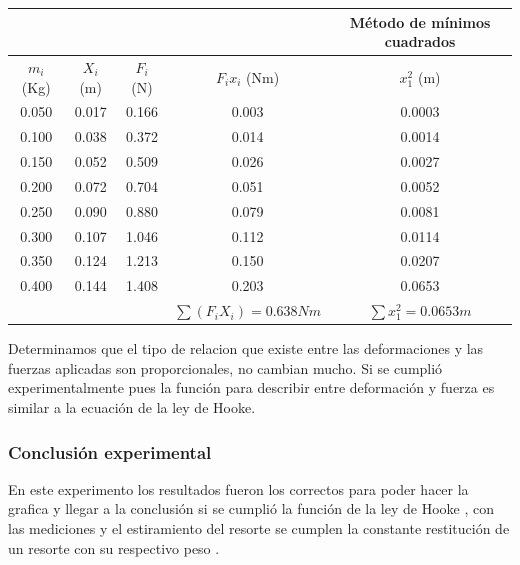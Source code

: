 \documentclass[10pt]{article}
\begin{document}
\begin{multicols}{2}
\begin{center}
	\begin{adjustbox}{width=245pt}
		\begin{tabular}{|c|c|c|c|c|}
			\hline
			 &  &  &  & Método de mínimos cuadrados   \\
			\hline
			$m_{i}$ (Kg)&  $X_{i}$ (m)& $F_{i}$ (N)& $F_{i} x_{i}$ (Nm)& $x_1^2$ (m) \\
			\hline
			0.050& 0.017 & 0.166 &0.003	 &0.0003 \\
			\hline
			0.100& 0.038& 0.372 &0.014  & 0.0014 \\
			\hline
			0.150& 0.052 & 0.509& 0.026 & 0.0027 \\
			\hline
			0.200&0.072 &0.704 &0.051 & 0.0052\\ 
			\hline
			0.250&  0.090& 0.880& 0.079&0.0081 \\
			\hline
			0.300 &0.107 &1.046 & 0.112& 0.0114\\
			\hline
			0.350& 0.124 &1.213  &0.150 &0.0207 \\
			\hline
			0.400& 0.144 &1.408 &0.203 &0.0653\\
		   \hline
		   &  &  &$\sum(F_{i} X_{i} )=0.638 Nm $&$ \sum x_{1}^2=0.0653 m$\\
		  \hline
		\end{tabular}
	\end{adjustbox}
\end{center}




Determinamos que el tipo de relacion que existe entre las deformaciones y las fuerzas aplicadas son proporcionales, no cambian mucho.
Si se cumplió experimentalmente pues la función para describir entre deformación y fuerza es similar a la ecuación de la ley de Hooke.  

\subsubsection{Conclusión experimental}
En este experimento los resultados fueron los correctos para poder hacer la grafica y llegar a la conclusión si se cumplió la función de la ley de Hooke , con las mediciones y el estiramiento del resorte se cumplen la constante restitución de un resorte con su respectivo peso .


\end{multicols}
\end{document}
